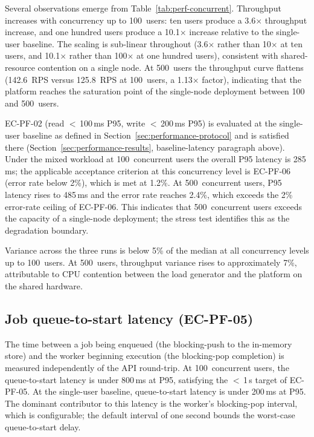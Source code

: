 \documentclass[a4paper,noexaminfo]{sapthesis}
\begin{document}
Several observations emerge from Table~\ref{tab:perf-concurrent}.
Throughput increases with concurrency up to 100~users: ten users
produce a 3.6$\times$ throughput increase, and one hundred users produce
a 10.1$\times$ increase relative to the single-user baseline.  The
scaling is sub-linear throughout (3.6$\times$ rather than 10$\times$
at ten users, and 10.1$\times$ rather than 100$\times$ at one hundred
users), consistent with shared-resource contention on a single node.
At 500~users the throughput curve flattens (142.6~RPS versus 125.8~RPS at
100~users, a 1.13$\times$ factor), indicating that the platform reaches
the saturation point of the single-node deployment between 100 and
500~users.

EC-PF-02 (read $<$\,100\,ms P95, write $<$\,200\,ms P95) is evaluated
at the single-user baseline as defined in Section~\ref{sec:performance-protocol}
and is satisfied there (Section~\ref{sec:performance-results},
baseline-latency paragraph above).  Under the mixed workload at
100~concurrent users the overall P95 latency is 285\,ms; the applicable
acceptance criterion at this concurrency level is EC-PF-06 (error rate
below 2\%), which is met at 1.2\%.  At
500~concurrent users, P95 latency rises to 485\,ms and the error rate
reaches 2.4\%, which exceeds the 2\% error-rate ceiling of EC-PF-06.
This indicates that 500~concurrent users exceeds the capacity of a
single-node deployment; the stress test identifies this as the
degradation boundary.

Variance across the three runs is below 5\% of the median at all
concurrency levels up to 100~users.  At 500~users, throughput variance
rises to approximately 7\%, attributable to CPU contention between the
load generator and the platform on the shared hardware.

\subsection{Job queue-to-start latency (EC-PF-05)}

The time between a job being enqueued (the blocking-push to the
in-memory store) and the worker beginning execution (the blocking-pop
completion) is measured independently of the API round-trip.  At
100~concurrent users, the queue-to-start latency is under 800\,ms at
P95, satisfying the $<$\,1\,s target of EC-PF-05.  At the single-user
baseline, queue-to-start latency is under 200\,ms at P95.  The
dominant contributor to this latency is the worker's blocking-pop
interval, which is configurable; the default interval of one second
bounds the worst-case queue-to-start delay.
\end{document}
